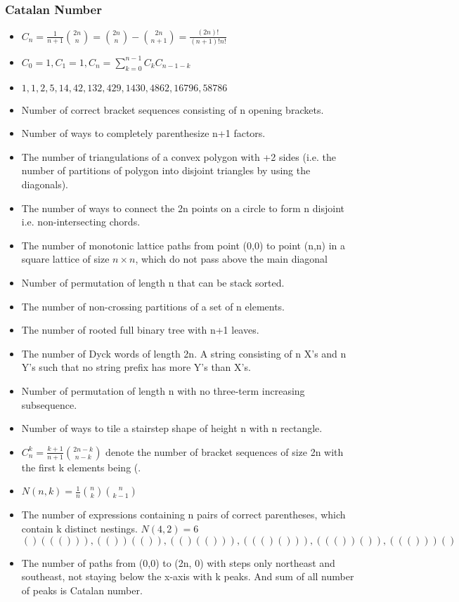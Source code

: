 \subsubsection{Catalan Number}
\vspace{2.5mm}
\begin{itemize}
    \item $C_n = \frac{1}{n+1}\binom{2n}{n} = \binom{2n}{n}-\binom{2n}{n+1} = \frac{(2n)!}{(n+1)!n!}$
    \item $C_0 = 1, C_1 = 1, C_n = \sum_{k=0}^{n-1}C_kC_{n-1-k}$
    \item $1, 1, 2, 5, 14, 42, 132, 429, 1430, 4862, 16796, 58786$
    \item Number of correct bracket sequences consisting of n opening brackets.
    \item Number of ways to completely parenthesize n+1 factors.
    \item The number of triangulations of a convex polygon with +2 sides (i.e. the number of partitions of polygon into disjoint triangles by using the diagonals).
    \item The number of ways to connect the 2n points on a circle to form n disjoint i.e. non-intersecting chords.
    \item The number of monotonic lattice paths from point (0,0) to point (n,n) in a square lattice of size $n\times n$, which do not pass above the main diagonal
    \item Number of permutation of length n that can be stack sorted.
    \item The number of non-crossing partitions of a set of n elements.
    \item The number of rooted full binary tree with n+1 leaves.
    \item The number of Dyck words of length 2n. A string consisting of n X's and n Y's such that no string prefix has more Y's than X's.
    \item Number of permutation of length n with no three-term increasing subsequence.
    \item Number of ways to tile a stairstep shape of height n with n rectangle.
    \item $C^k_n = \frac{k+1}{n+1}\binom{2n-k}{n-k}$ denote the number of bracket sequences of size 2n with the first k elements being (.
    \item $N(n,k) = \frac{1}{n}\binom{n}{k}\binom{n}{k-1}$
    \item The number of expressions containing n pairs of correct parentheses, which contain k distinct nestings.
    $N(4,2) = 6$ \\
    $()((())), (())(()), (()(())), ((()())), ((())()), ((()))()$
    \item The number of paths from (0,0) to (2n, 0) with steps only northeast and southeast, not staying below the x-axis with k peaks. And sum of all number of peaks is Catalan number.
\end{itemize}
